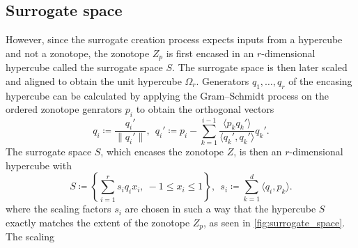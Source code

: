\documentclass[
  a4paper,  %
  twoside,  %
  bibliography=totoc,
  headsepline,
  cleardoublepage=empty,
  parskip=half,
  draft=false
]{scrbook}
\begin{document}
\subsection{Surrogate space}

However, since the surrogate creation process expects inputs from a hypercube and not a zonotope, the zonotope $Z_p$ is first encased in an $r$-dimensional hypercube called the surrogate space $S$.
The surrogate space is then later scaled and aligned to obtain the unit hypercube $\Omega_r$.
Generators $q_1, \dots, q_r$ of the encasing hypercube can be calculated by applying the Gram–Schmidt process on the ordered zonotope genrators $p_i$ to obtain the orthogonal vectors
\begin{equation}
q_i \coloneqq \frac{q_i'}{\| q_i' \|},~~ q_i' \coloneqq p_i - \sum_{k=1}^{i-1} \frac{\langle p_k q_k'\rangle}{\langle q_k', q_k' \rangle} q_k'.
\label{q}
\end{equation}
The surrogate space $S$, which encases the zonotope $Z$, is then an $r$-dimensional hypercube with
\begin{equation}
S \coloneqq \left\{\sum_{i=1}^r s_i q_i x_i, ~ -1 \leq x_i \leq 1\right\},~~ s_i \coloneqq \sum_{k=1}^d \langle q_i, p_k\rangle.
\label{surrogate_space}
\end{equation}
where the scaling factors $s_i$ are chosen in such a way that the hypercube $S$ exactly matches the extent of the zonotope $Z_p$, as seen in \cref{fig:surrogate_space}.
The scaling 
\end{document}
